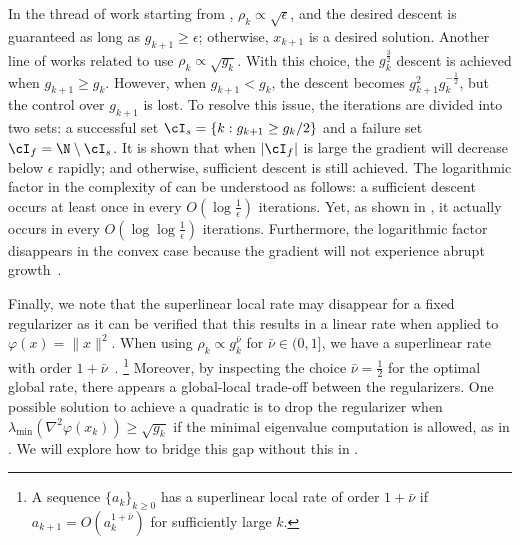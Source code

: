 In the thread of work starting from \cite{royer2020newton}, $\rho_k \propto \sqrt \epsilon$, and the desired descent is guaranteed as long as $g_{k+1} \geq \epsilon$; otherwise, $x_{k+1}$ is a desired solution. 
Another line of works related to \citet{mishchenko2023regularized,gratton2024yet} use $\rho_k \propto \sqrt{g_k}$.
With this choice, the $g_k^{\frac{3}{2}}$ descent is achieved when $g_{k+1} \geq g_k$.
However, when $g_{k+1} < g_k$, the descent becomes $g_{k+1}^2 g_{k}^{-\frac{1}{2}}$, but the control over $g_{k+1}$ is lost. 
To resolve this issue, the iterations are divided into two sets: a successful set $\cI_s = \{ k : g_{k+1} \geq g_k / 2 \}$ and a failure set $\cI_f = \N \setminus \cI_s$. 
It is shown that when $|\cI_f|$ is large the gradient will decrease below $\epsilon$ rapidly;
and otherwise, sufficient descent is still achieved.
The logarithmic factor in the complexity of \citet{gratton2024yet} can be understood as follows: a sufficient descent occurs at least once in every $O(\log \frac{1}{\epsilon})$ iterations.
Yet, as shown in , 
it actually occurs in every $O(\log\log\frac{1}{\epsilon})$ iterations.
Furthermore, the logarithmic factor disappears in the convex case because the gradient will not experience abrupt growth~\citep{mishchenko2023regularized,doikov2024gradient}.


Finally, we note that the superlinear local rate may disappear for a fixed regularizer as it can be verified that this results in a linear rate when applied to $\varphi(x) = \|x\|^2$. %
When using $\rho_k \propto g_k^{\bar \nu}$ for $\bar \nu \in (0, 1]$, we have a superlinear rate with order $1 + \bar \nu$~\citep{yamashita2001rate, dan2002convergence, li2004regularized, fan2005quadratic, bergou2020convergence, marumo2023majorization}.%
\footnote{A sequence $\{ a_k \}_{k \geq 0}$ has a superlinear local rate of order $1 + \bar\nu$ if $a_{k+1} = O(a_k^{1 + \bar\nu})$ for sufficiently large $k$.} 
Moreover, by inspecting the choice $\bar \nu = \frac{1}{2}$ for the optimal global rate, there appears a global-local trade-off between the regularizers.
One possible solution to achieve a quadratic is to drop the regularizer when $\lambda_{\mathrm{min}}(\nabla^2\varphi(x_k)) \geq \sqrt{g_k}$ if the minimal eigenvalue computation is allowed, as in \citet{goldfeld1966maximization,jiang2023universal}.
We will explore how to bridge this gap without this in .

